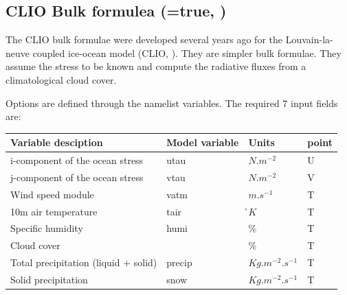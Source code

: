 \subsection    [CLIO Bulk formulea (\np{ln\_clio}=true)]
		      {CLIO Bulk formulea (=true, )}
\label{SBC_blk_clio}

The CLIO bulk formulae were developed several years ago for the 
Louvain-la-neuve coupled ice-ocean model (CLIO, \cite{Goosse_al_JGR99}). 
They are simpler bulk formulae. They assume the stress to be known and 
compute the radiative fluxes from a climatological cloud cover. 

Options are defined through the   namelist variables.
The required 7 input fields are:

\begin{table}[htbp]   \label{Tab_CLIO}
\begin{center}
\begin{tabular}{|l|l|l|l|}
\hline
Variable desciption				& Model variable	& Units				& point \\	\hline
i-component of the ocean stress		& utau			& $N.m^{-2}$			& U \\	\hline
j-component of the ocean stress		& vtau			& $N.m^{-2}$			& V \\	\hline
Wind speed module					& vatm			& $m.s^{-1}$			& T \\	\hline
10m air temperature					& tair			& \r{}$K$				& T \\	\hline
Specific humidity						& humi			& \%					& T \\	\hline
Cloud cover							& 				& \%					& T \\	\hline
Total precipitation (liquid + solid)	& precip		& $Kg.m^{-2}.s^{-1}$	& T \\	\hline
Solid precipitation 					& snow			& $Kg.m^{-2}.s^{-1}$	& T \\	\hline
\end{tabular}
\end{center}
\end{table}

